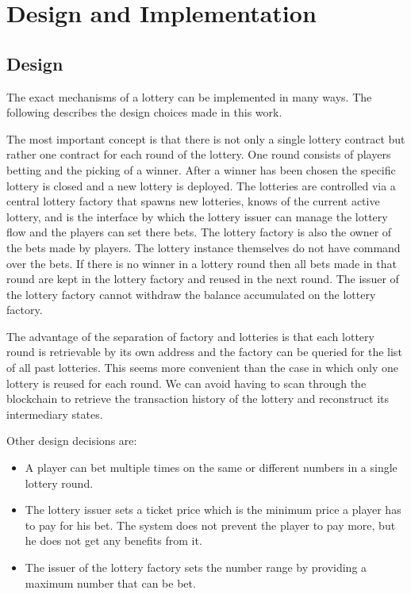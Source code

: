\chapter{Design and Implementation}

\section{Design}

The exact mechanisms of a lottery can be implemented in many ways. The following
describes the design choices made in this work.

The most important concept is that there is not only a single lottery contract
but rather one contract for each round of the lottery. One round consists of
players betting and the picking of a winner. After a winner has been chosen the
specific lottery is closed and a new lottery is deployed. The lotteries are
controlled via a central lottery factory that spawns new lotteries, knows of the
current active lottery, and is the interface by which the lottery issuer can
manage the lottery flow and the players can set there bets. The lottery factory
is also the owner of the bets made by players. The lottery instance themselves
do not have command over the bets. If there is no winner in a lottery round then
all bets made in that round are kept in the lottery factory and reused in the
next round. The issuer of the lottery factory cannot withdraw the balance
accumulated on the lottery factory.

The advantage of the separation of factory and lotteries is that each lottery
round is retrievable by its own address and the factory can be queried for the
list of all past lotteries. This seems more convenient than the case in which
only one lottery is reused for each round. We can avoid having to scan through
the blockchain to retrieve the transaction history of the lottery and
reconstruct its intermediary states.

Other design decisions are:
\begin{itemize}
  \item A player can bet multiple times on the same or different numbers in a
  single lottery round.
  \item The lottery issuer sets a ticket price which is the minimum price a player
  has to pay for his bet. The system does not prevent the player to pay more,
  but he does not get any benefits from it. 
  \item The issuer of the lottery factory sets the number range by providing a
  maximum number that can be bet.
\end{itemize}

